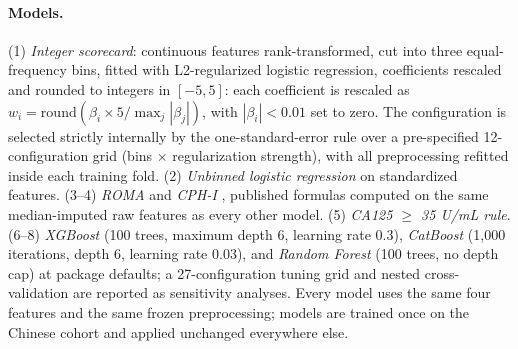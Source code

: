 \documentclass[pmlr,twocolumn,10pt]{jmlr} %
\begin{document}
\paragraph{Models.} (1) \emph{Integer scorecard}: continuous features
rank-transformed, cut into three equal-frequency bins, fitted with
L2-regularized logistic regression, coefficients rescaled and rounded to
integers in $[-5,5]$: each coefficient is rescaled as
$w_i=\mathrm{round}(\beta_i \times 5 / \max_j|\beta_j|)$, with
$|\beta_i|<0.01$ set to zero. The configuration is
selected strictly internally by the one-standard-error rule over a
pre-specified 12-configuration grid (bins $\times$ regularization
strength), with all preprocessing refitted inside each training fold.
(2) \emph{Unbinned logistic regression} on standardized features.
(3--4) \emph{ROMA} \citep{moore2011} and \emph{CPH-I}
\citep{karlsen2015}, published formulas computed on the same median-imputed
raw features as every other model. (5) \emph{CA125 $\ge$ 35 U/mL rule}.
(6--8) \emph{XGBoost} \citep{chen2016} (100 trees, maximum depth 6,
learning rate 0.3), \emph{CatBoost} \citep{prokhorenkova2018} (1{,}000
iterations, depth 6, learning rate 0.03), and \emph{Random Forest}
\citep{breiman2001} (100 trees, no depth cap) at package defaults; a
27-configuration tuning grid and nested cross-validation are reported as
sensitivity analyses. Every model uses the same four features and the same
frozen preprocessing; models are trained once on the Chinese cohort and
applied unchanged everywhere else.
\end{document}
